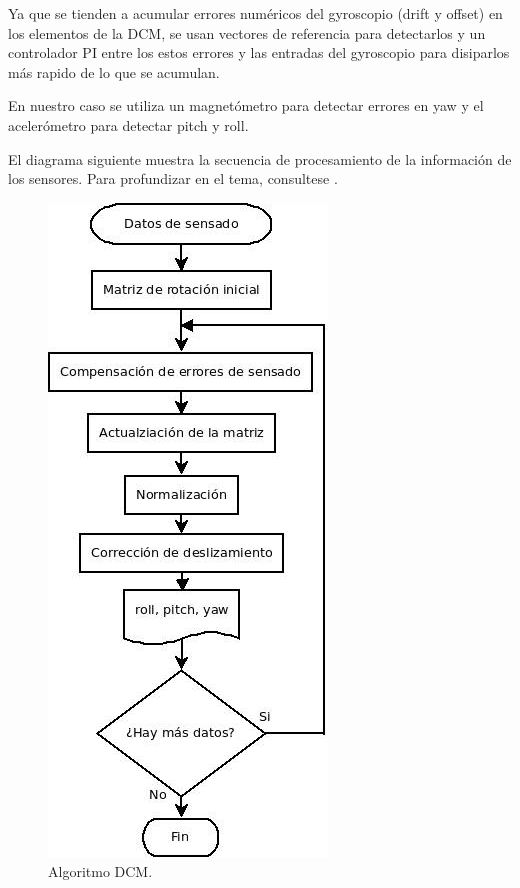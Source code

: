 	Ya que se tienden a acumular errores numéricos del gyroscopio (drift y offset) en los elementos de la DCM, se usan vectores de referencia para detectarlos y un controlador PI entre los estos errores y las entradas del gyroscopio para disiparlos más rapido de lo que se acumulan.

	En nuestro caso se utiliza un magnetómetro para detectar errores en yaw y el acelerómetro para detectar pitch y roll.

	El diagrama siguiente muestra la secuencia de procesamiento de la información de los sensores. Para profundizar en el tema, consultese \cite{Premerlany}.

		\begin{figure}[h]
		\begin{center}
		\includegraphics[scale=0.5]{imagenes/3-boomerang/DCM.jpg}
		\caption{Algoritmo DCM.}
		\label{fig24}
		\end{center}
		\end{figure}


